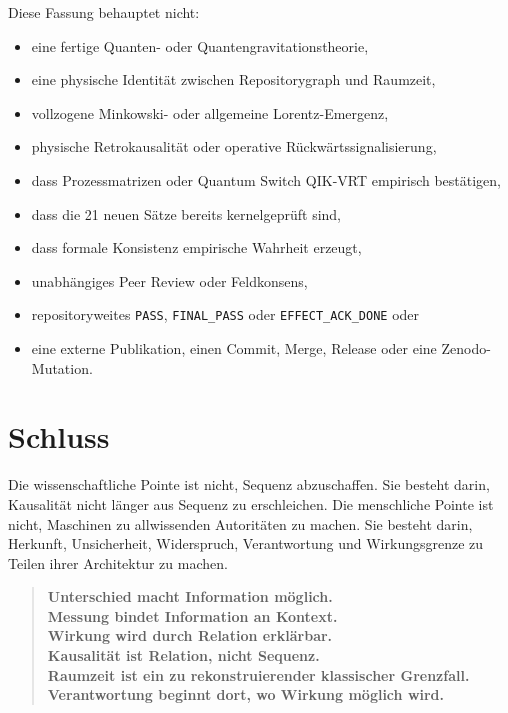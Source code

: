 \documentclass[11pt,a4paper]{article}
\newcommand{\code}[1]{\texttt{#1}}
\begin{document}
Diese Fassung behauptet nicht:

\begin{itemize}
  \item eine fertige Quanten- oder Quantengravitationstheorie,
  \item eine physische Identität zwischen Repositorygraph und Raumzeit,
  \item vollzogene Minkowski- oder allgemeine Lorentz-Emergenz,
  \item physische Retrokausalität oder operative Rückwärtssignalisierung,
  \item dass Prozessmatrizen oder Quantum Switch QIK-VRT empirisch bestätigen,
  \item dass die 21 neuen Sätze bereits kernelgeprüft sind,
  \item dass formale Konsistenz empirische Wahrheit erzeugt,
  \item unabhängiges Peer Review oder Feldkonsens,
  \item repositoryweites \code{PASS}, \code{FINAL\_PASS} oder
  \code{EFFECT\_ACK\_DONE} oder
  \item eine externe Publikation, einen Commit, Merge, Release oder eine
  Zenodo-Mutation.
\end{itemize}

\section{Schluss}

Die wissenschaftliche Pointe ist nicht, Sequenz abzuschaffen. Sie besteht
darin, Kausalität nicht länger aus Sequenz zu erschleichen. Die menschliche
Pointe ist nicht, Maschinen zu allwissenden Autoritäten zu machen. Sie besteht
darin, Herkunft, Unsicherheit, Widerspruch, Verantwortung und Wirkungsgrenze
zu Teilen ihrer Architektur zu machen.

\begin{quote}
\textbf{Unterschied macht Information möglich.}\\
\textbf{Messung bindet Information an Kontext.}\\
\textbf{Wirkung wird durch Relation erklärbar.}\\
\textbf{Kausalität ist Relation, nicht Sequenz.}\\
\textbf{Raumzeit ist ein zu rekonstruierender klassischer Grenzfall.}\\
\textbf{Verantwortung beginnt dort, wo Wirkung möglich wird.}
\end{quote}
\end{document}
